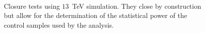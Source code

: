 \begin{figure}[h!]
  \centering
  ~~
  \\
  \caption{\label{fig:closureTests} Closure tests using $13$~TeV simulation. They close by construction but allow for the determination of the statistical power of the control samples used by the analysis.}
\end{figure}